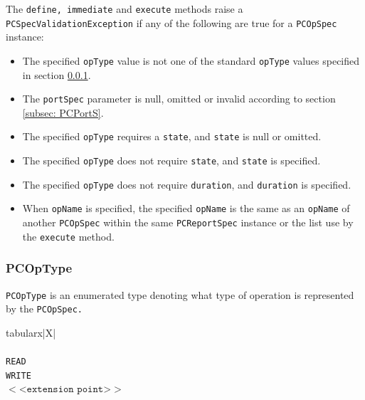 \documentclass[11pt,a4paper,oneside]{article}
\newenvironment{bbox}%
{\begin{table}[h!]\begin{threeparttable}}%
{\end{threeparttable}\end{table}\FloatBarrier}
\newenvironment{bbox}
{\ifvmode\IgnorePar\fi \EndP\Tg<div class='bbox'>}{\Tg</div>\IgnoreIndent}
\begin{document}
The \texttt{define, immediate} and \texttt{execute} methods raise a\ifpdf\\ \fi
\texttt{PCSpecValidationException} if any of the following are true for a \texttt{PCOpSpec} instance:

\begin{itemize}
\item	The specified \texttt{opType} value is not one of the standard \texttt{opType} values specified in section \ref{subsec: PCType}.
\item	The \texttt{portSpec} parameter is null, omitted or invalid according to section \ref{subsec: PCPortS}.
\item	The specified \texttt{opType} requires a \texttt{state}, and \texttt{state} is null or omitted.
\item	The specified \texttt{opType} does not require \texttt{state}, and \texttt{state} is specified.
\item	The specified \texttt{opType} does not require \texttt{duration}, and \texttt{duration} is specified.
\item	When \texttt{opName} is specified, the specified \texttt{opName} is the same as an \texttt{opName} of another \texttt{PCOpSpec} within the same \texttt{PCReportSpec} instance or the list use by the \texttt{execute} method.
\end{itemize}

\subsubsection{PCOpType}
\label{subsec: PCType}
\texttt{PCOpType} is an enumerated type denoting what type of operation is represented by the \texttt{PCOpSpec.}

\begin{bbox}
\begin{edtable}{tabularx}{\linewidth}{|X|}
\hline 
{}
\\
\\
\texttt{READ}\\
\texttt{WRITE}\\
$<$<$\texttt{extension point}$>$>$\\
\texttt{\textendash \textendash \textendash}\\
\hline
\end{edtable}
\end{bbox}
\end{document}
